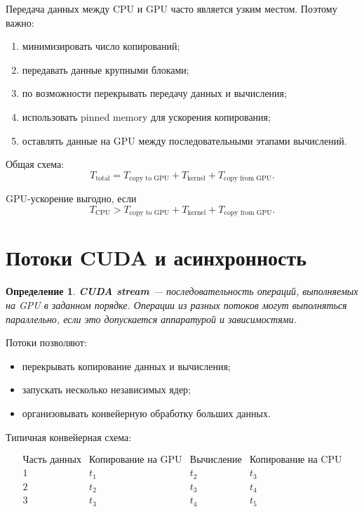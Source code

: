 \documentclass[12pt,a4paper]{article}
\newtheorem{definition}{Определение}
\begin{document}
Передача данных между CPU и GPU часто является узким местом. Поэтому важно:

\begin{enumerate}
    \item минимизировать число копирований;
    \item передавать данные крупными блоками;
    \item по возможности перекрывать передачу данных и вычисления;
    \item использовать pinned memory для ускорения копирования;
    \item оставлять данные на GPU между последовательными этапами вычислений.
\end{enumerate}

Общая схема:
\[
    T_{\text{total}} =
    T_{\text{copy to GPU}} +
    T_{\text{kernel}} +
    T_{\text{copy from GPU}}.
\]

GPU-ускорение выгодно, если
\[
    T_{\text{CPU}} >
    T_{\text{copy to GPU}} +
    T_{\text{kernel}} +
    T_{\text{copy from GPU}}.
\]

\section{Потоки CUDA и асинхронность}

\begin{definition}
\textbf{CUDA stream} --- последовательность операций, выполняемых на GPU в заданном порядке. Операции из разных потоков могут выполняться параллельно, если это допускается аппаратурой и зависимостями.
\end{definition}

Потоки позволяют:

\begin{itemize}
    \item перекрывать копирование данных и вычисления;
    \item запускать несколько независимых ядер;
    \item организовывать конвейерную обработку больших данных.
\end{itemize}

Типичная конвейерная схема:

\[
\begin{array}{c|ccc}
\text{Часть данных} & \text{Копирование на GPU} & \text{Вычисление} & \text{Копирование на CPU} \\
\hline
1 & t_1 & t_2 & t_3 \\
2 & t_2 & t_3 & t_4 \\
3 & t_3 & t_4 & t_5
\end{array}
\]
\end{document}

